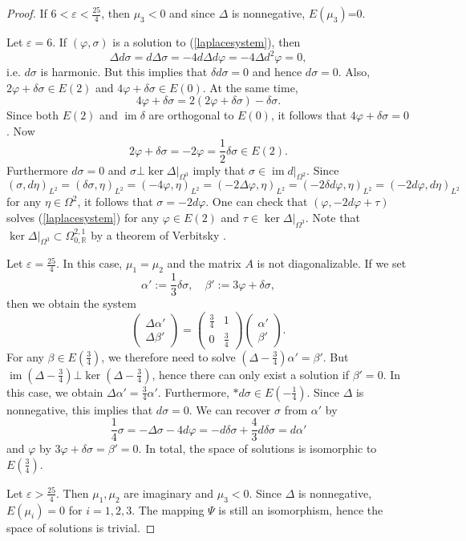 \documentclass[12pt]{scrartcl}
\theoremstyle{plain}
\theoremstyle{definition}
\newcommand{\R}{\mathbb{R}}%
\newcommand{\im}{\operatorname{im}}%
\begin{document}
\begin{proof}
If $6<\varepsilon<\frac{25}{4}$, then $\mu_3<0$ and since $\Delta$ is nonnegative, $E(\mu_3)$=0.

Let $\varepsilon=6$. If $(\varphi,\sigma)$ is a solution to (\ref{laplacesystem}), then
\[\Delta d\sigma=d\Delta\sigma=-4d\Delta d\varphi=-4\Delta d^2\varphi=0,\]
i.e. $d\sigma$ is harmonic. But this implies that $\delta d\sigma=0$ and hence $d\sigma=0$. Also, $2\varphi+\delta\sigma\in E(2)$ and $4\varphi+\delta\sigma\in E(0)$. At the same time,
\[4\varphi+\delta\sigma=2(2\varphi+\delta\sigma)-\delta\sigma.\]
Since both $E(2)$ and $\im\delta$ are orthogonal to $E(0)$, it follows that $4\varphi+\delta\sigma=0$. Now
\[2\varphi+\delta\sigma=-2\varphi=\frac{1}{2}\delta\sigma\in E(2).\]
Furthermore $d\sigma=0$ and $\sigma\bot\ker\Delta\big|_{\Omega^3}$ imply that $\sigma\in\im d\big|_{\Omega^2}$. Since
\[(\sigma,d\eta)_{L^2}=(\delta\sigma,\eta)_{L^2}=(-4\varphi,\eta)_{L^2}=(-2\Delta\varphi,\eta)_{L^2}=(-2\delta d\varphi,\eta)_{L^2}=(-2d\varphi,d\eta)_{L^2}\]
for any $\eta\in\Omega^2$, it follows that $\sigma=-2d\varphi$. One can check that $(\varphi,-2d\varphi+\tau)$ solves (\ref{laplacesystem}) for any $\varphi\in E(2)$ and $\tau\in\ker\Delta\big|_{\Omega^3}$. Note that $\ker\Delta\big|_{\Omega^3}\subset\Omega^{2,1}_{0,\R}$ by a theorem of Verbitsky \cite[Thm.~6.2]{verbitsky}.

Let $\varepsilon=\frac{25}{4}$. In this case, $\mu_1=\mu_2$ and the matrix $A$ is not diagonalizable. If we set
\[\alpha':=\frac{1}{3}\delta\sigma,\quad\beta':=3\varphi+\delta\sigma,\]
then we obtain the system
\[\begin{pmatrix}
	\Delta\alpha'\\
   \Delta\beta'
  \end{pmatrix}=\begin{pmatrix}
   \frac{3}{4}&1\\
   0&\frac{3}{4}
  \end{pmatrix}\begin{pmatrix}
   \alpha'\\
   \beta'
  \end{pmatrix}.\]
For any $\beta\in E(\frac{3}{4})$, we therefore need to solve $(\Delta-\frac{3}{4})\alpha'=\beta'$. But $\im(\Delta-\frac{3}{4})\bot\ker(\Delta-\frac{3}{4})$, hence there can only exist a solution if $\beta'=0$. In this case, we obtain $\Delta\alpha'=\frac{3}{4}\alpha'$. Furthermore, $\ast d\sigma\in E(-\frac{1}{4})$. Since $\Delta$ is nonnegative, this implies that $d\sigma=0$. We can recover $\sigma$ from $\alpha'$ by
\[\frac{1}{4}\sigma=-\Delta\sigma-4d\varphi=-d\delta\sigma+\frac{4}{3}d\delta\sigma=d\alpha'\]
and $\varphi$ by $3\varphi+\delta\sigma=\beta'=0$. In total, the space of solutions is isomorphic to $E(\frac{3}{4})$.

Let $\varepsilon>\frac{25}{4}$. Then $\mu_1,\mu_2$ are imaginary and $\mu_3<0$. Since $\Delta$ is nonnegative, $E(\mu_i)=0$ for $i=1,2,3$. The mapping $\Psi$ is still an isomorphism, hence the space of solutions is trivial.
\end{proof}
\end{document}
